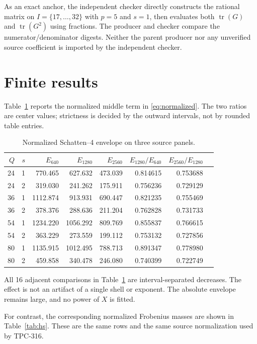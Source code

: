\documentclass[10pt,a4paper]{article}
\newcommand{\tr}{\operatorname{tr}}
\begin{document}
As an exact anchor, the independent checker directly constructs the rational
matrix on $I=\{17,\ldots,32\}$ with $p=5$ and $s=1$, then evaluates both
$\tr(G)$ and $\tr(G^2)$ using fractions.  The producer and checker compare
the numerator/denominator digests.  Neither the parent producer nor any
unverified source coefficient is imported by the independent checker.

\section{Finite results}

Table~\ref{tab:s4} reports the normalized middle term in
\eqref{eq:normalized}.  The two ratios are center values; strictness is
decided by the outward intervals, not by rounded table entries.

\begin{table}[t]
\centering
\setlength{\tabcolsep}{3.5pt}
\scriptsize
\caption{Normalized Schatten--4 envelope on three source panels.}
\label{tab:s4}
\begin{tabular}{rrr rrr rr}
\toprule
$Q$ & $s$ & $E_{640}$ & $E_{1280}$ & $E_{2560}$ &
 $E_{1280}/E_{640}$ & $E_{2560}/E_{1280}$\\
\midrule
24&1&770.465&627.632&473.039&0.814615&0.753688\\
24&2&319.030&241.262&175.911&0.756236&0.729129\\
36&1&1112.874&913.931&690.447&0.821235&0.755469\\
36&2&378.376&288.636&211.204&0.762828&0.731733\\
54&1&1234.220&1056.292&809.769&0.855837&0.766615\\
54&2&363.229&273.559&199.112&0.753132&0.727856\\
80&1&1135.915&1012.495&788.713&0.891347&0.778980\\
80&2&459.858&340.478&246.080&0.740399&0.722749\\
\bottomrule
\end{tabular}
\end{table}

All 16 adjacent comparisons in Table~\ref{tab:s4} are interval-separated
decreases.  The effect is not an artifact of a single shell or exponent.  The
absolute envelope remains large, and no power of $X$ is fitted.

For contrast, the corresponding normalized Frobenius masses are shown in
Table~\ref{tab:hs}.  These are the same rows and the same source normalization
used by TPC-316.
\end{document}
